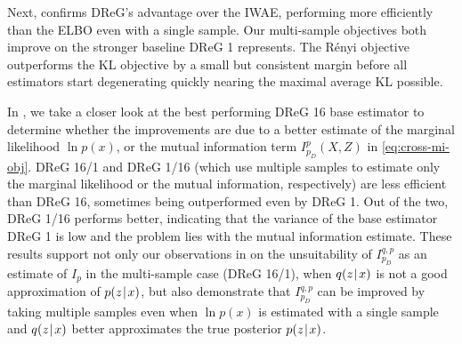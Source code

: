 Next,  confirms DReG's advantage over the IWAE, performing more efficiently than the ELBO even with a single sample.
Our multi-sample objectives both improve on the stronger baseline DReG 1 represents.
The Rényi objective outperforms the KL objective by a small but consistent margin before all estimators start degenerating quickly nearing the maximal average KL possible.

In , we take a closer look at the best performing DReG 16 base estimator to determine whether the improvements are due to a better estimate of the marginal likelihood $\ln p(x)$, or the mutual information term $I_{p_D}^p(X,Z)$ in \eqref{eq:cross-mi-obj}.
DReG 16/1 and DReG 1/16 (which use multiple samples to estimate only the marginal likelihood or the mutual information, respectively) are less efficient than DReG 16, sometimes being outperformed even by DReG 1.
Out of the two, DReG 1/16 performs better, indicating that the variance of the base estimator DReG 1 is low and the problem lies with the mutual information estimate.
These results support not only our observations in  on the unsuitability of $I^{q,p}_{p_D}$ as an estimate of $I_p$ in the multi-sample case (DReG 16/1), when $q(z\hspace{0.08em}|\hspace{0.11em} x)$ is not a good approximation of $p(z\hspace{0.08em}|\hspace{0.11em} x)$, but also demonstrate that $I^{q,p}_{p_D}$ can be improved by taking multiple samples even when $\ln p(x)$ is estimated with a single sample and $q(z\hspace{0.08em}|\hspace{0.11em} x)$ better approximates the true posterior $p(z\hspace{0.08em}|\hspace{0.11em} x)$.


